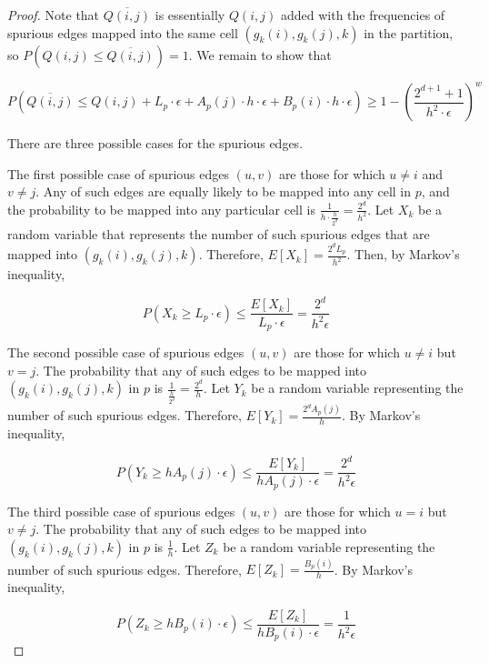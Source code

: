 \begin{proof}
  Note that $\overline{Q(i,j)}$ is essentially $Q(i,j)$ added with the frequencies of spurious edges mapped into the same cell $(g_k(i),g_k(j),k)$ in the partition, so $P(Q(i,j) \leq \overline{Q(i,j)}) = 1$. We remain to show that

\[
P(\overline{Q(i,j)} \leq Q(i,j) + L_p \cdot \epsilon + A_p(j) \cdot h \cdot \epsilon + B_p(i) \cdot h \cdot \epsilon) \geq 1-(\frac{2^{d+1}+1}{h^2\cdot\epsilon})^w
\]

  There are three possible cases for the spurious edges.
  
The first possible case of spurious edges $(u,v)$ are those for which $u \neq i$ and $v \neq j$. Any of such edges are equally likely to be mapped into any cell in $p$, and the probability to be mapped into any particular cell is $\frac{1}{h \cdot \frac{h}{2^d}} = \frac{2^d}{h^2}$. Let $X_k$ be a random variable that represents the number of such spurious edges that are mapped into $(g_k(i),g_k(j),k)$. Therefore, $E[X_k] = \frac{2^dL_p}{h^2}$. Then, by Markov's inequality,

\begin{equation} \label{efreq1}
P(X_k \geq L_p \cdot \epsilon) \leq \frac{E[X_k]}{L_p \cdot \epsilon} = \frac{2^d}{h^2\epsilon}
\end{equation}

The second possible case of spurious edges $(u,v)$ are those for which $u \neq i$ but $v=j$. The probability that any of such edges to be mapped into $(g_k(i),g_k(j),k)$ in $p$ is $\frac{1}{\frac{h}{2^d}} = \frac{2^d}{h}$. Let $Y_k$ be a random variable representing the number of such spurious edges. Therefore, $E[Y_k] = \frac{2^dA_p(j)}{h}$. By Markov's inequality,

\begin{equation} \label{efreq2}
P(Y_k \geq h A_p(j) \cdot \epsilon) \leq \frac{E[Y_k]}{h A_p(j) \cdot \epsilon} = \frac{2^d}{h^2\epsilon}
\end{equation}

The third possible case of spurious edges $(u,v)$ are those for which $u=i$ but $v \neq j$. The probability that any of such edges to be mapped into $(g_k(i),g_k(j),k)$ in $p$ is $\frac{1}{h}$. Let $Z_k$ be a random variable representing the number of such spurious edges. Therefore, $E[Z_k] = \frac{B_p(i)}{h}$. By Markov's inequality,

\begin{equation} \label{efreq3}
P(Z_k \geq h B_p(i) \cdot \epsilon) \leq \frac{E[Z_k]}{h B_p(i) \cdot \epsilon} = \frac{1}{h^2\epsilon}
\end{equation}


\end{proof}
